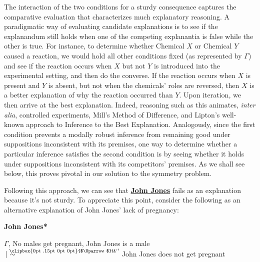 \documentclass{article}                     %
\makeatletter
\newcommand{\Uuparrow}{%
	\raisebox{.2ex}{\clipbox{0pt .15pt 0pt 0pt}{$\Uparrow$}}
}
\newcommand{\nms}{%
	\mathbin{\mathpalette\@nms\expandafter}
}
\newcommand{\@nms}{\mid\joinrel\mkern-.5mu\sim}
\newcommand{\mrc}[1]{\mathbin{
		\mathchoice
		{\normalsize\hspace{.5mm}\nms^{\mkern-19mu\scriptsize\Uuparrow#1}\hspace{-.5mm}}
		{\normalsize\hspace{.5mm}\nms^{\mkern-19mu\scriptsize\Uuparrow#1}\hspace{-.5mm}}
		{\footnotesize\hspace{.5mm}\nms^{\mkern-13.5mu\fontsize{5.5}{0}\Uuparrow#1}}
		{\scriptsize\nms^{\mkern-10mu\tiny\Uuparrow#1}}
	}
}
\makeatother
\begin{document}
The interaction of the two conditions for a sturdy consequence captures the comparative evaluation that characterizes much explanatory reasoning. A paradigmatic way of evaluating candidate explanations is to see if the explanandum still holds when one of the competing explanantia is false while the other is true. For instance, to determine whether Chemical $X$ or Chemical $Y$ caused a reaction, we would hold all other conditions fixed (as represented by $\Gamma$) and see if the reaction occurs when $X$ but not $Y$ is introduced into the experimental setting, and then do the converse. If the reaction occurs when $X$ is present and $Y$ is absent, but not when the chemicals' roles are reversed, then $X$ is a better explanation of why the reaction occurred than $Y$. Upon iteration, we then arrive at the best explanation. Indeed, reasoning such as this animates, \textit{inter alia}, controlled experiments, Mill's Method of Difference, and Lipton's \citeyearpar{Lipton2004} well-known approach to Inference to the Best Explanation. Analogously, since the first condition prevents a modally robust inference from remaining good under suppositions inconsistent with its premises, one way to determine whether a particular inference satisfies the second condition is by seeing whether it holds under suppositions inconsistent with its competitors' premises. As we shall see below, this proves pivotal in our solution to the symmetry problem.

Following this approach, we can see that \hyperref[JohnJones]{\textbf{John Jones}} fails as an explanation because it's not sturdy. To appreciate this point, consider the following as an alternative explanation of John Jones' lack of pregnancy:\newline

\noindent \label{JohnJones*}\textbf{John Jones*}\hspace{8mm}\begin{minipage}[t]{.8\textwidth}
$\Gamma$, No males get pregnant, John Jones is a male\\
$ \mrc{W'} $  John Jones does not get pregnant\\
\end{minipage}
\end{document}
